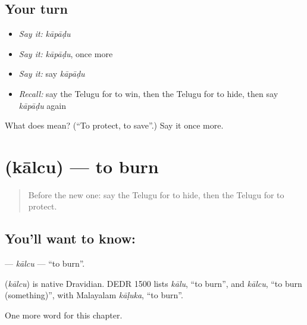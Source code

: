 \subsection*{Your turn}
\begin{itemize}
\raggedright
  \item \emph{Say it:} \emph{kāpāḍu}
  \item \emph{Say it:} \emph{kāpāḍu}, once more
  \item \emph{Say it:} say \emph{kāpāḍu}
  \item \emph{Recall:} say the Telugu for to win, then the Telugu for to hide, then say \emph{kāpāḍu} again
\end{itemize}

\begin{tcolorbox}[breakable,colback=teal!4,colframe=teal!35!black,title={Before you move on}]
What does  mean? (\textquotedblleft{}To protect, to save\textquotedblright{}.) Say it once more.
\end{tcolorbox}
\section[\texorpdfstring{\te{కాల్చు} (kālcu)}{కాల్చు (kālcu)}]{ (kālcu) — to burn}

\label{lesson:TE-C148-kalcu}



\begin{quote}
Before the new one: say the Telugu for to hide, then the Telugu for to protect.
\end{quote}

\subsection*{You'll want to know: }
\textbf{} — \emph{kālcu} — \textquotedblleft{}to burn\textquotedblright{}.

\begin{cousinweb}
\textbf{} (\emph{kālcu}) is native Dravidian. DEDR 1500 lists \emph{kālu}, \textquotedblleft{}to burn\textquotedblright{}, and \emph{kālcu}, \textquotedblleft{}to burn (something)\textquotedblright{}, with Malayalam \emph{kāḷuka}, \textquotedblleft{}to burn\textquotedblright{}.
\end{cousinweb}

\begin{grammarlens}[title={What you've built}]
One more word for this chapter.
\end{grammarlens}

